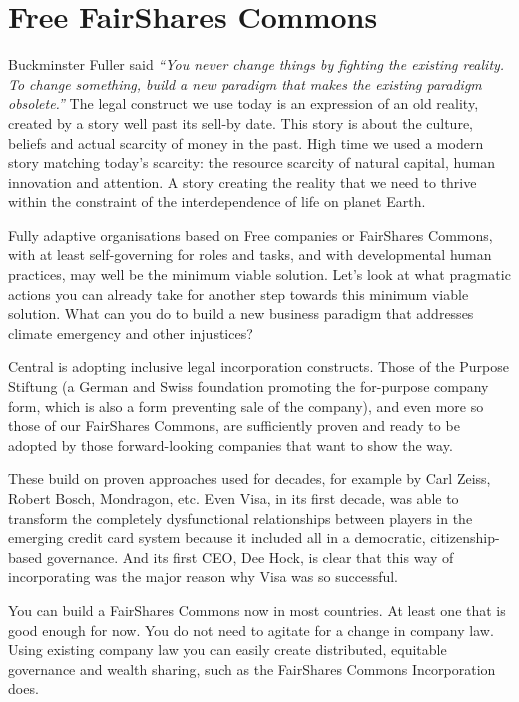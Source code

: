 \section{Free FairShares Commons}
Buckminster Fuller said \emph{“You never change things by fighting the existing reality. To change something, build a new paradigm that makes the existing paradigm obsolete.”} The legal construct we use today is an expression of an old reality, created by a story well past its sell-by date. This story is about the culture, beliefs and actual scarcity of money in the past. High time we used a modern story matching today’s scarcity: the resource scarcity of natural capital, human innovation and attention. A story creating the reality that we need to thrive within the constraint of the interdependence of life on planet Earth.


Fully adaptive organisations based on Free companies or FairShares Commons, with at least self-governing for roles and tasks, and with developmental human practices, may well be the minimum viable solution. Let’s look at what pragmatic actions you can already take for another step towards this minimum viable solution. What can you do to build a new business paradigm that addresses climate emergency and other injustices?


Central is adopting inclusive legal incorporation constructs. Those of the Purpose Stiftung (a German and Swiss foundation promoting the for-purpose company form, which is also a form preventing sale of the company), and even more so those of our FairShares Commons, are sufficiently proven and ready to be adopted by those forward-looking companies that want to show the way.


These build on proven approaches used for decades, for example by Carl Zeiss, Robert Bosch, Mondragon, etc. Even Visa, in its first decade, was able to transform the completely dysfunctional relationships between players in the emerging credit card system because it included all in a democratic, citizenship-based governance. And its first CEO, Dee Hock, is clear that this way of incorporating was the major reason why Visa was so successful.


You can build a FairShares Commons now in most countries. At least one that is good enough for now. You do not need to agitate for a change in company law. Using existing company law you can easily create distributed, equitable governance and wealth sharing, such as the FairShares Commons Incorporation does.


